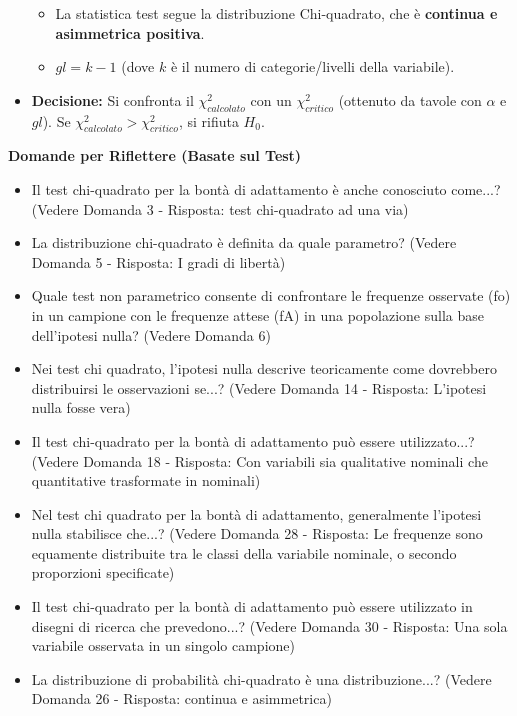 \documentclass[12pt, a4paper]{article}
\newenvironment{reflectionbox}{%
    \medskip
    \begin{framed}\par\noindent
    \textbf{\color{boxtitlecolor}Domande per Riflettere (Basate sul Test)} \par
    \begin{itemize}[leftmargin=*, label=$\blacktriangleright$]
}{%
    \end{itemize}\par
    \end{framed}
    \medskip
}
\newcommand{\chisq}{\chi^2} %
\newcommand{\Hnull}{H_0} %
\newcommand{\df}{gl} %
\newcommand{\alphaerr}{\alpha} %
\begin{document}
\begin{itemize}
        \begin{itemize}
            \item La statistica test segue la distribuzione Chi-quadrato, che è \textbf{continua e asimmetrica positiva}.
            \item $\df = k - 1$ (dove $k$ è il numero di categorie/livelli della variabile).
        \end{itemize}
    \item \textbf{Decisione:} Si confronta il $\chisq_{calcolato}$ con un $\chisq_{critico}$ (ottenuto da tavole con $\alphaerr$ e $\df$). Se $\chisq_{calcolato} > \chisq_{critico}$, si rifiuta $\Hnull$.
\end{itemize}

\begin{reflectionbox}
    \item Il test chi-quadrato per la bontà di adattamento è anche conosciuto come...? (Vedere Domanda 3 - Risposta: test chi-quadrato ad una via)
    \item La distribuzione chi-quadrato è definita da quale parametro? (Vedere Domanda 5 - Risposta: I gradi di libertà)
    \item Quale test non parametrico consente di confrontare le frequenze osservate (fo) in un campione con le frequenze attese (fA) in una popolazione sulla base dell'ipotesi nulla? (Vedere Domanda 6)
    \item Nei test chi quadrato, l'ipotesi nulla descrive teoricamente come dovrebbero distribuirsi le osservazioni se...? (Vedere Domanda 14 - Risposta: L'ipotesi nulla fosse vera)
    \item Il test chi-quadrato per la bontà di adattamento può essere utilizzato...? (Vedere Domanda 18 - Risposta: Con variabili sia qualitative nominali che quantitative trasformate in nominali)
    \item Nel test chi quadrato per la bontà di adattamento, generalmente l'ipotesi nulla stabilisce che...? (Vedere Domanda 28 - Risposta: Le frequenze sono equamente distribuite tra le classi della variabile nominale, o secondo proporzioni specificate)
    \item Il test chi-quadrato per la bontà di adattamento può essere utilizzato in disegni di ricerca che prevedono...? (Vedere Domanda 30 - Risposta: Una sola variabile osservata in un singolo campione)
    \item La distribuzione di probabilità chi-quadrato è una distribuzione...? (Vedere Domanda 26 - Risposta: continua e asimmetrica)
\end{reflectionbox}
\end{document}
